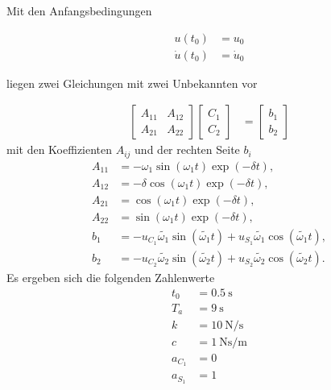 \begin{solution}
    Mit den Anfangsbedingungen

    \begin{align*}
        u(t_0) &= u_0 \\
        \dot{u}(t_0) &= \dot{u}_0
    \end{align*}

    liegen zwei Gleichungen mit zwei Unbekannten vor

    \begin{align*}
        \begin{bmatrix}
            A_{11} & A_{12}\\
            A_{21} & A_{22}
        \end{bmatrix}
        \begin{bmatrix}
            C_1 \\
            C_2
        \end{bmatrix}
        &=
        \begin{bmatrix}
        b_1 \\
        b_2
        \end{bmatrix} 
        \end{align*}
        mit den Koeffizienten $A_{ij}$ und der rechten Seite $b_i$
        \begin{align*}
            A_{11}&= -\omega_1 \sin(\omega_1 t) \exp(-\delta t),\\
            A_{12}&= - \delta \cos(\omega_1 t) \exp(-\delta t),\\
            A_{21}&= \cos(\omega_1 t) \exp(-\delta t),\\
            A_{22}&= \sin(\omega_1 t) \exp(-\delta t),\\
            b_{1}&= -u_{C_1} \tilde{\omega_1} \sin(\tilde{\omega_1}t) + u_{S_1} \tilde{\omega_1} \cos(\tilde{\omega_1}t),\\
            b_{2}&= -u_{C_2} \tilde{\omega_2} \sin(\tilde{\omega_2}t) + u_{S_2} \tilde{\omega_2} \cos(\tilde{\omega_2}t).
    \end{align*}
    Es ergeben sich die folgenden Zahlenwerte
            \begin{align*}
            t_0 &= \SI{0.5}{\second}\\
            T_a &= \SI{9}{\second} \\
            k &=  \SI{10}{\newton \per \second} \\
            c &= \SI{1}{\newton \second \per \meter} \\
            a_{C_1} &= 0 \\
            a_{S_1} &= 1 \\

\end{align*}
\end{solution}
